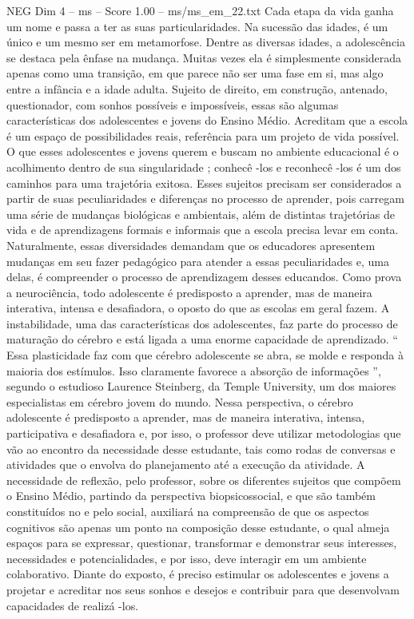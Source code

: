 \begin{textsample}{NEG Dim 4 – ms – Score 1.00 – ms/ms\_em\_22.txt}
Cada etapa da vida ganha um nome e passa a ter as suas particularidades.
Na sucessão das idades, é um único e um mesmo ser em metamorfose.
Dentre as diversas idades, a adolescência se destaca pela ênfase na mudança.
Muitas vezes ela é simplesmente considerada apenas como uma transição, em que parece não ser uma fase em si, mas algo entre a infância e a idade adulta.
Sujeito de direito, em construção, antenado, questionador, com sonhos possíveis e impossíveis, essas são algumas características dos adolescentes e jovens do Ensino Médio.
Acreditam que a escola é um espaço de possibilidades reais, referência para um projeto de vida possível.
O que esses adolescentes e jovens querem e buscam no ambiente educacional é o acolhimento dentro de sua singularidade ; conhecê -los e reconhecê -los é um dos caminhos para uma trajetória exitosa.
Esses sujeitos precisam ser considerados a partir de suas peculiaridades e diferenças no processo de aprender, pois carregam uma série de mudanças biológicas e ambientais, além de distintas trajetórias de vida e de aprendizagens formais e informais que a escola precisa levar em conta.
Naturalmente, essas diversidades demandam que os educadores apresentem mudanças em seu fazer pedagógico para atender a essas peculiaridades e, uma delas, é compreender o processo de aprendizagem desses educandos.
Como prova a neurociência, todo adolescente é predisposto a aprender, mas de maneira interativa, intensa e desafiadora, o oposto do que as escolas em geral fazem.
A instabilidade, uma das características dos adolescentes, faz parte do processo de maturação do cérebro e está ligada a uma enorme capacidade de aprendizado. “ Essa plasticidade faz com que cérebro adolescente se abra, se molde e responda à maioria dos estímulos.
Isso claramente favorece a absorção de informações ”, segundo o estudioso Laurence Steinberg, da Temple University, um dos maiores especialistas em cérebro jovem do mundo.
Nessa perspectiva, o cérebro adolescente é predisposto a aprender, mas de maneira interativa, intensa, participativa e desafiadora e, por isso, o professor deve utilizar metodologias que vão ao encontro da necessidade desse estudante, tais como rodas de conversas e atividades que o envolva do planejamento até a execução da atividade.
A necessidade de reflexão, pelo professor, sobre os diferentes sujeitos que compõem o Ensino Médio, partindo da perspectiva biopsicossocial, e que são também constituídos no e pelo social, auxiliará na compreensão de que os aspectos cognitivos são apenas um ponto na composição desse estudante, o qual almeja espaços para se expressar, questionar, transformar e demonstrar seus interesses, necessidades e potencialidades, e por isso, deve interagir em um ambiente colaborativo.
Diante do exposto, é preciso estimular os adolescentes e jovens a projetar e acreditar nos seus sonhos e desejos e contribuir para que desenvolvam capacidades de realizá -los.

\end{textsample}
